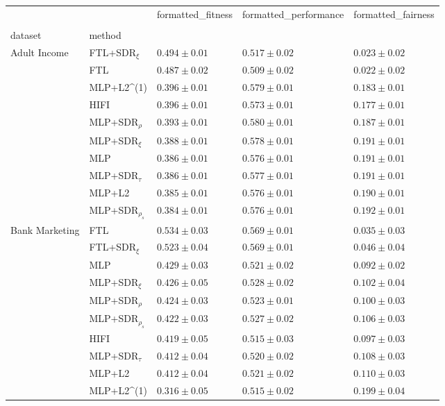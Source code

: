 \begin{tabular}{lllll}
\toprule
 &  & formatted_fitness & formatted_performance & formatted_fairness \\
 &  &  &  &  \\
dataset & method &  &  &  \\
\midrule
\multirow[t]{10}{*}{Adult Income} & FTL+SDR$_{\xi}$ & $0.494 \pm0.01$ & $0.517 \pm0.02$ & $0.023 \pm0.02$ \\
 & FTL & $0.487 \pm0.02$ & $0.509 \pm0.02$ & $0.022 \pm0.02$ \\
 & MLP+L2^{(1)} & $0.396 \pm0.01$ & $0.579 \pm0.01$ & $0.183 \pm0.01$ \\
 & HIFI & $0.396 \pm0.01$ & $0.573 \pm0.01$ & $0.177 \pm0.01$ \\
 & MLP+SDR$_{\rho}$ & $0.393 \pm0.01$ & $0.580 \pm0.01$ & $0.187 \pm0.01$ \\
 & MLP+SDR$_{\xi}$ & $0.388 \pm0.01$ & $0.578 \pm0.01$ & $0.191 \pm0.01$ \\
 & MLP & $0.386 \pm0.01$ & $0.576 \pm0.01$ & $0.191 \pm0.01$ \\
 & MLP+SDR$_{\tau}$ & $0.386 \pm0.01$ & $0.577 \pm0.01$ & $0.191 \pm0.01$ \\
 & MLP+L2 & $0.385 \pm0.01$ & $0.576 \pm0.01$ & $0.190 \pm0.01$ \\
 & MLP+SDR$_{\rho_s}$ & $0.384 \pm0.01$ & $0.576 \pm0.01$ & $0.192 \pm0.01$ \\
\cline{1-5}
\multirow[t]{10}{*}{Bank Marketing} & FTL & $0.534 \pm0.03$ & $0.569 \pm0.01$ & $0.035 \pm0.03$ \\
 & FTL+SDR$_{\xi}$ & $0.523 \pm0.04$ & $0.569 \pm0.01$ & $0.046 \pm0.04$ \\
 & MLP & $0.429 \pm0.03$ & $0.521 \pm0.02$ & $0.092 \pm0.02$ \\
 & MLP+SDR$_{\xi}$ & $0.426 \pm0.05$ & $0.528 \pm0.02$ & $0.102 \pm0.04$ \\
 & MLP+SDR$_{\rho}$ & $0.424 \pm0.03$ & $0.523 \pm0.01$ & $0.100 \pm0.03$ \\
 & MLP+SDR$_{\rho_s}$ & $0.422 \pm0.03$ & $0.527 \pm0.02$ & $0.106 \pm0.03$ \\
 & HIFI & $0.419 \pm0.05$ & $0.515 \pm0.03$ & $0.097 \pm0.03$ \\
 & MLP+SDR$_{\tau}$ & $0.412 \pm0.04$ & $0.520 \pm0.02$ & $0.108 \pm0.03$ \\
 & MLP+L2 & $0.412 \pm0.04$ & $0.521 \pm0.02$ & $0.110 \pm0.03$ \\
 & MLP+L2^{(1)} & $0.316 \pm0.05$ & $0.515 \pm0.02$ & $0.199 \pm0.04$ \\

\end{tabular}
